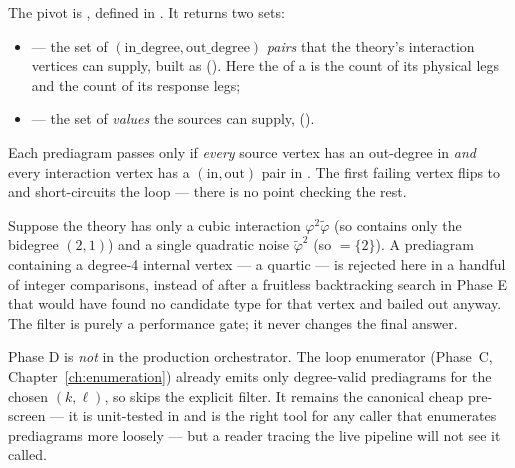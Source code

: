 The pivot is , defined in
. It returns two sets:

\begin{itemize}
  \item {} --- the set of $(\text{in\_degree},
        \text{out\_degree})$ \emph{pairs} that the theory's interaction vertices
        can supply, built as
        (). Here the  of a 
        is the count of its physical legs and  the count of its
        response legs;
  \item {} --- the set of  \emph{values} the
        sources can supply, 
        ().
\end{itemize}

Each prediagram passes only if \emph{every} source vertex has an out-degree in
 \emph{and} every interaction vertex has a $(\text{in},
\text{out})$ pair in . The first failing vertex flips
 to  and short-circuits the loop --- there is no point
checking the rest.

\begin{example}
Suppose the theory has only a cubic interaction $\varphi^2\tilde\varphi$ (so
 contains only the bidegree $(2,1)$) and a single quadratic noise
$\tilde\varphi^2$ (so $=\{2\}$). A prediagram containing a
degree-4 internal vertex --- a quartic --- is rejected here in a handful of
integer comparisons, instead of after a fruitless backtracking search in Phase E
that would have found no candidate type for that vertex and bailed out anyway.
The filter is purely a performance gate; it never changes the final answer.
\end{example}

\begin{note}
Phase D is \emph{not} in the production orchestrator. The loop enumerator
(Phase~C, Chapter~\ref{ch:enumeration}) already emits only degree-valid
prediagrams for the chosen $(k,\ell)$, so 
skips the explicit filter. It remains the canonical cheap pre-screen --- it is
unit-tested in  and is the right tool for any caller
that enumerates prediagrams more loosely --- but a reader tracing the live
pipeline will not see it called.
\end{note}

